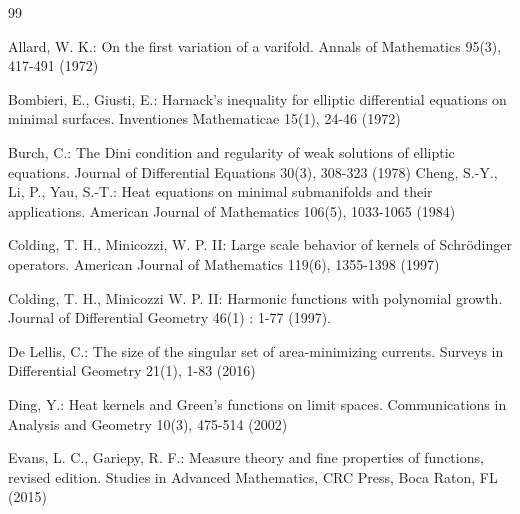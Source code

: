 \documentclass[11pt]{amsart}
\theoremstyle{definition}
\begin{document}
\begin{thebibliography}{99}
	
	Allard, W. K.: On the first variation of a varifold.  
	Annals of Mathematics 95(3), 417-491 (1972)
	
	
	Bombieri, E., Giusti, E.: Harnack's inequality for elliptic differential equations on minimal surfaces.  
	Inventiones Mathematicae 15(1), 24-46 (1972)
	
	Burch, C.: The Dini condition and regularity of weak solutions of elliptic equations.  
	Journal of Differential Equations 30(3), 308-323 (1978)
	Cheng, S.-Y., Li, P., Yau, S.-T.: Heat equations on minimal submanifolds and their applications.  
	American Journal of Mathematics 106(5), 1033-1065 (1984)
	
	Colding, T. H., Minicozzi, W. P. II: Large scale behavior of kernels of Schr\"odinger operators.  
	American Journal of Mathematics 119(6), 1355-1398 (1997)
	
	Colding, T. H.,  Minicozzi W. P. II: Harmonic functions with polynomial growth. Journal of Differential Geometry 46(1) : 1-77 (1997).
	
	De Lellis, C.: The size of the singular set of area-minimizing currents.  
	Surveys in Differential Geometry 21(1), 1-83 (2016)
	
	Ding, Y.: Heat kernels and Green's functions on limit spaces.  
	Communications in Analysis and Geometry 10(3), 475-514 (2002)
	
	Evans, L. C., Gariepy, R. F.: Measure theory and fine properties of functions, revised edition.  
	Studies in Advanced Mathematics, CRC Press, Boca Raton, FL (2015)
	

\end{thebibliography}
\end{document}
